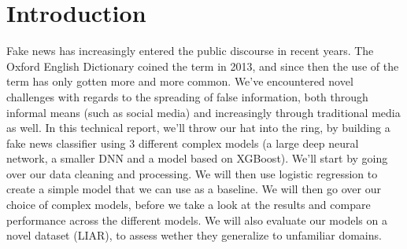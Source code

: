 \section*{Introduction}
Fake news has increasingly entered the public discourse in recent years. The Oxford English Dictionary coined the term
in 2013, and since then the use of the term has only gotten more and more common. We've encountered
novel challenges with regards to the spreading of false information, both through informal means (such as social media)
and increasingly through traditional media as well. In this technical report, we'll throw our hat
into the ring, by building a fake news classifier using 3 different complex models (a large deep neural network, a
smaller DNN and a model based on XGBoost). We'll start by going over our
data cleaning and processing. We will then use logistic regression to create a simple model that we can use as a
baseline. We will then go over our choice of complex models, before we take a look at the results and compare
performance across the different models. We will also evaluate our models on a novel dataset (LIAR), to assess wether
they generalize to unfamiliar domains.
